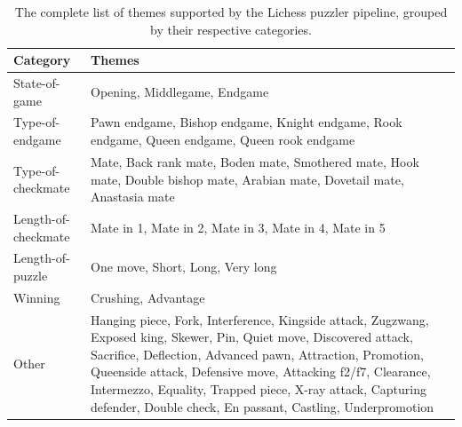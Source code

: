 \begin{table}[h]
    \centering
    \renewcommand{\arraystretch}{1.3}
    \begin{tabular}{l p{10cm}}
        \hline
        \textbf{Category} & \textbf{Themes} \\
        \hline
        State-of-game & Opening, Middlegame, Endgame \\
        Type-of-endgame & Pawn endgame, Bishop endgame, Knight endgame, Rook endgame, Queen endgame, Queen rook endgame \\
        Type-of-checkmate & Mate, Back rank mate, Boden mate, Smothered mate, Hook mate, Double bishop mate, Arabian mate, Dovetail mate, Anastasia mate \\
        Length-of-checkmate & Mate in 1, Mate in 2, Mate in 3, Mate in 4, Mate in 5 \\
        Length-of-puzzle & One move, Short, Long, Very long \\
        Winning & Crushing, Advantage \\
        Other & Hanging piece, Fork, Interference, Kingside attack, Zugzwang, Exposed king, Skewer, Pin, Quiet move, Discovered attack, Sacrifice, Deflection, Advanced pawn, Attraction, Promotion, Queenside attack, Defensive move, Attacking f2/f7, Clearance, Intermezzo, Equality, Trapped piece, X-ray attack, Capturing defender, Double check, En passant, Castling, Underpromotion \\
        \hline
    \end{tabular}
    \caption{The complete list of themes supported by the Lichess puzzler pipeline, grouped by their respective categories.}
    \label{tab:themes}
\end{table}

